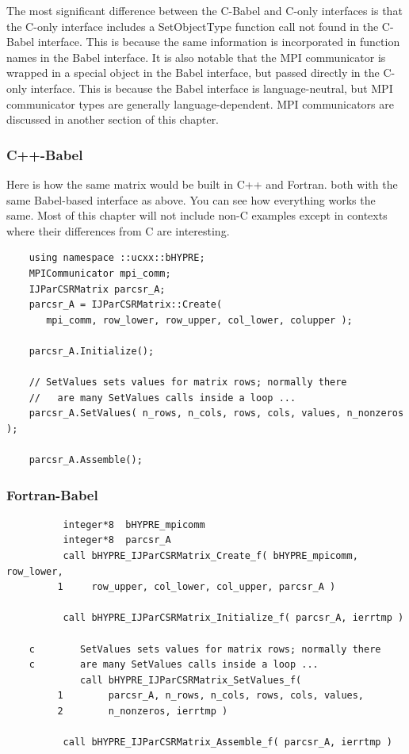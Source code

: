 The most significant difference between the C-Babel and C-only
interfaces is that the C-only interface includes a SetObjectType
function call not found in the C-Babel interface.  This is because the
same information is incorporated in function names in the Babel
interface.  It is also notable that the MPI communicator is wrapped in
a special object in the Babel interface, but passed directly in the
C-only interface.  This is because the Babel interface is
language-neutral, but MPI communicator types are generally
language-dependent.  MPI communicators are discussed in another
section of this chapter.

\subsubsection{C++-Babel}
Here is how the same matrix would be built in C++ and Fortran.
both with the same Babel-based interface as above.
You can see how everything works the same.  Most of this chapter
will not include non-C examples except in contexts where their differences
from C are interesting.

\begin{verbatim}
    using namespace ::ucxx::bHYPRE;
    MPICommunicator mpi_comm;
    IJParCSRMatrix parcsr_A;
    parcsr_A = IJParCSRMatrix::Create(
       mpi_comm, row_lower, row_upper, col_lower, colupper );

    parcsr_A.Initialize();

    // SetValues sets values for matrix rows; normally there
    //   are many SetValues calls inside a loop ...
    parcsr_A.SetValues( n_rows, n_cols, rows, cols, values, n_nonzeros );

    parcsr_A.Assemble();
\end{verbatim}


\subsubsection{Fortran-Babel}
\begin{verbatim}
          integer*8  bHYPRE_mpicomm
          integer*8  parcsr_A
          call bHYPRE_IJParCSRMatrix_Create_f( bHYPRE_mpicomm, row_lower,
         1     row_upper, col_lower, col_upper, parcsr_A )

          call bHYPRE_IJParCSRMatrix_Initialize_f( parcsr_A, ierrtmp )

    c        SetValues sets values for matrix rows; normally there
    c        are many SetValues calls inside a loop ...
             call bHYPRE_IJParCSRMatrix_SetValues_f(
         1        parcsr_A, n_rows, n_cols, rows, cols, values,
         2        n_nonzeros, ierrtmp )

          call bHYPRE_IJParCSRMatrix_Assemble_f( parcsr_A, ierrtmp )
\end{verbatim}



